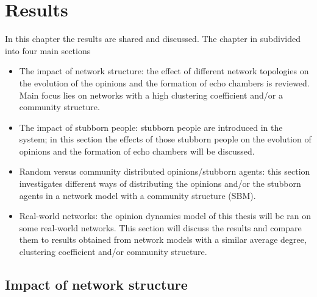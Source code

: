 \documentclass[11 pt , letterpaper , twoside , openright]{book}
\begin{document}
\chapter{Results}

In this chapter the results are shared and discussed. The chapter in subdivided into four main sections
\begin{itemize}
	\item The impact of network structure: the effect of different network topologies on the evolution of the opinions and the formation of echo chambers is reviewed. Main focus lies on networks with a high clustering coefficient and/or a community structure.
	\item The impact of stubborn people: stubborn people are introduced in the system; in this section the effects of those stubborn people on the evolution of opinions and the formation of echo chambers will be discussed.
	\item Random versus community distributed opinions/stubborn agents: this section investigates different ways of distributing the opinions and/or the stubborn agents in a network model with a community structure (SBM).
	\item Real-world networks: the opinion dynamics model of this thesis will be ran on some real-world networks. This section will discuss the results and compare them to results obtained from network models with a similar average degree, clustering coefficient and/or community structure.
\end{itemize}

\section{Impact of network structure}
\end{document}
